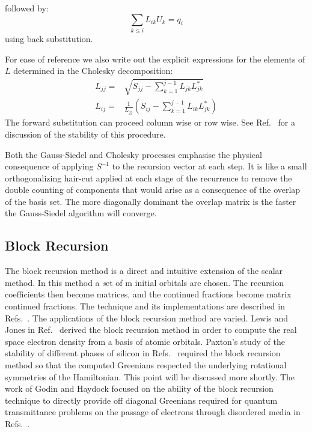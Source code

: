 followed by:
%
\begin{equation}
\sum_{k\leq i} L_{ik}U_{k} = q_{i}
\end{equation}
%
using back substitution. 

For ease of reference we also write out the explicit expressions 
for the elements of $L$ determined in the Cholesky decomposition:
%
\begin{align}
L_{jj} =& \sqrt{S_{jj} - \sum_{k=1}^{j-1}L_{jk}L^{*}_{jk}}\\
L_{ij} =& \frac{1}{L_{jj}}(S_{ij}-\sum_{k=1}^{j-1}L_{ik}L^{*}_{jk})
\end{align}
%
The forward substitution can proceed column wise or row wise. 
See Ref.~\cite{wilkinson68} for a discussion of the 
stability of this procedure.

Both the Gauss-Siedel and Cholesky processes emphasise the physical consequence
of applying $S^{-1}$ to the recursion vector at each step.
It is like a small orthogonalizing hair-cut applied at each stage of the recurrence
to remove the double counting of components that would arise 
as a consequence of the overlap of the basis set. The more 
diagonally dominant the overlap matrix is the faster the Gauss-Siedel 
algorithm will converge.

\subsection{Block Recursion}
The block recursion method is a direct and intuitive extension of the scalar method.
In this method a {\emph set of m} initial orbitals are chosen. The recursion
coefficients then become matrices, and the continued fractions become
matrix continued fractions. The technique and its implementations are described 
in Refs.~\cite{jones84, legrand85, inoue87, nex89, godin91}. 
The applications of the block recursion method are varied.
Lewis and Jones in Ref.~\cite{jones84} derived the block recursion method
in order to compute the real space electron density from a basis of atomic orbitals.
Paxton's study of the stability of different phases of silicon in 
Refs.~\cite{paxton87, paxton88} required the block recursion method so that
the computed Greenians respected the underlying rotational symmetries of the 
Hamiltonian. This point will be discussed more shortly. The work of 
Godin and Haydock focused on the ability of the block recursion technique
to directly provide off diagonal Greenians required for quantum transmittance problems
on the passage of electrons through disordered media in Refs.~\cite{godin86, godin88}. 

